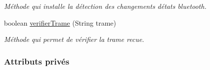 \begin{DoxyCompactItemize}
\begin{DoxyCompactList}\small\item\em Méthode qui installe la détection des changements d\textquotesingle{}états bluetooth. \end{DoxyCompactList}\item 
boolean \hyperlink{classcom_1_1example_1_1ekawa_1_1_communication_a6421eb8129e103841f088870610b1b33}{verifier\+Trame} (String trame)
\begin{DoxyCompactList}\small\item\em Méthode qui permet de vérifier la trame recue. \end{DoxyCompactList}\end{DoxyCompactItemize}
\subsubsection*{Attributs privés}
